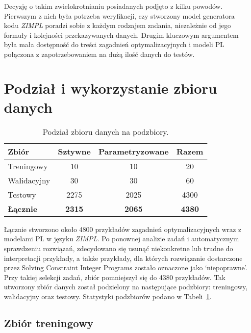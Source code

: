 Decyzję o takim zwielokrotnianiu posiadanych podjęto z kilku powodów. Pierwszym z nich była potrzeba weryfikacji, czy stworzony model generatora kodu  \textit{ZIMPL} poradzi sobie z każdym rodzajem zadania, niezależnie od jego formuły i kolejności przekazywanych danych. Drugim kluczowym argumentem była mała dostępność do treści zagadnień optymalizacyjnych i modeli PL połączona z zapotrzebowaniem na dużą ilość danych do testów.

\section{Podział i wykorzystanie zbioru danych}

\begin{table}
\caption{Podział zbioru danych na podzbiory.}\label{tab:dataset:stats}
\centering%
\begin{tabular}{|l|c|c|c|}
\hline
\textbf{Zbiór} & \textbf{Sztywne} & \textbf{Parametryzowane} & \textbf{Razem} \\
\hline
Treningowy & 10 & 10 & 20\\
\hline
Walidacyjny & 30 & 30 & 60\\
\hline
Testowy & 2275 & 2025 & 4300\\
\hline
\textbf{Łącznie} & \textbf{2315} & \textbf{2065} & \textbf{4380}\\
\hline
\end{tabular}
\end{table}

Łącznie stworzono około 4800 przykładów zagadnień optymalizacyjnych wraz z modelami PL w języku  \textit{ZIMPL}. Po ponownej analizie zadań i automatycznym sprawdzeniu rozwiązań, zdecydowano się usunąć niekonkretne lub trudne do interpretacji przykłady, a także przykłady, dla których rozwiązanie dostarczone przez Solving Constraint Integer Programs zostało oznaczone jako `niepoprawne'. Przy takiej selekcji zadań, zbiór pomniejszył się do 4380 przykładów. Tak utworzony zbiór danych został podzielony na następujące podzbiory: treningowy, walidacyjny oraz testowy. Statystyki podzbiorów podano w Tabeli~\ref{tab:dataset:stats}. 

\subsection{Zbiór treningowy}

